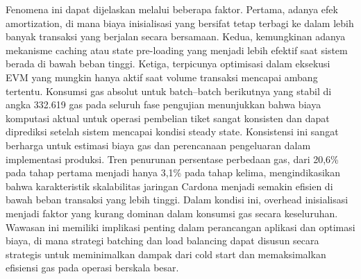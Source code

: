 Fenomena ini dapat dijelaskan melalui beberapa faktor. Pertama, adanya efek
amortization, di mana biaya inisialisasi yang bersifat tetap terbagi ke dalam
lebih banyak transaksi yang berjalan secara bersamaan. Kedua, kemungkinan
adanya mekanisme caching atau state pre-loading yang menjadi lebih efektif saat
sistem berada di bawah beban tinggi. Ketiga, terpicunya optimisasi dalam
eksekusi EVM yang mungkin hanya aktif saat volume transaksi mencapai ambang
tertentu. Konsumsi gas absolut untuk batch–batch berikutnya yang stabil di
angka 332.619 gas pada seluruh fase pengujian menunjukkan bahwa biaya komputasi
aktual untuk operasi pembelian tiket sangat konsisten dan dapat diprediksi
setelah sistem mencapai kondisi steady state. Konsistensi ini sangat berharga
untuk estimasi biaya gas dan perencanaan pengeluaran dalam implementasi
produksi. Tren penurunan persentase perbedaan gas, dari 20,6\% pada tahap
pertama menjadi hanya 3,1\% pada tahap kelima, mengindikasikan bahwa
karakteristik skalabilitas jaringan Cardona menjadi semakin efisien di bawah
beban transaksi yang lebih tinggi. Dalam kondisi ini, overhead inisialisasi
menjadi faktor yang kurang dominan dalam konsumsi gas secara keseluruhan.
Wawasan ini memiliki implikasi penting dalam perancangan aplikasi dan optimasi
biaya, di mana strategi batching dan load balancing dapat disusun secara
strategis untuk meminimalkan dampak dari cold start dan memaksimalkan efisiensi
gas pada operasi berskala besar.

